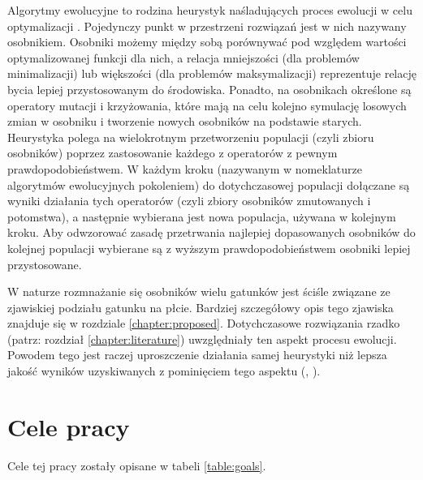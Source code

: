 \documentclass[twoside]{iisthesis}
\begin{document}
Algorytmy ewolucyjne to rodzina heurystyk naśladujących proces ewolucji w celu optymalizacji \cite{davis1991handbook}. Pojedynczy punkt w przestrzeni rozwiązań jest w nich nazywany osobnikiem. Osobniki możemy między sobą porównywać pod względem wartości optymalizowanej funkcji dla nich, a relacja mniejszości (dla problemów minimalizacji) lub większości (dla problemów maksymalizacji) reprezentuje relację bycia lepiej przystosowanym do środowiska. Ponadto, na osobnikach określone są operatory mutacji i krzyżowania, które mają na celu kolejno symulację losowych zmian w osobniku i tworzenie nowych osobników na podstawie starych. Heurystyka polega na wielokrotnym przetworzeniu populacji (czyli zbioru osobników) poprzez zastosowanie każdego z operatorów z pewnym prawdopodobieństwem. W każdym kroku (nazywanym w nomeklaturze algorytmów ewolucyjnych pokoleniem) do dotychczasowej populacji dołączane są wyniki działania tych operatorów (czyli zbiory osobników zmutowanych i potomstwa), a następnie wybierana jest nowa populacja, używana w kolejnym kroku. Aby odwzorować zasadę przetrwania najlepiej dopasowanych osobników do kolejnej populacji wybierane są z wyższym prawdopodobieństwem osobniki lepiej przystosowane.

W naturze rozmnażanie się osobników wielu gatunków jest ściśle związane ze zjawiskiej podziału gatunku na płcie. Bardziej szczegółowy opis tego zjawiska znajduje się w rozdziale \ref{chapter:proposed}. Dotychczasowe rozwiązania rzadko (patrz: rozdział \ref{chapter:literature}) uwzględniały ten aspekt procesu ewolucji. Powodem tego jest raczej uproszczenie działania samej heurystyki niż lepsza jakość wyników uzyskiwanych z pominięciem tego aspektu (\cite{GGA}, \cite{SexualGA}). 

\section{Cele pracy}

Cele tej pracy zostały opisane w tabeli \ref{table:goals}.

\FloatBarrier
\end{document}

